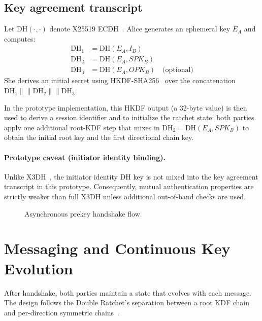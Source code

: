 \documentclass[11pt]{article}
\begin{document}
\subsection{Key agreement transcript}
Let $\mathrm{DH}(\cdot,\cdot)$ denote X25519 ECDH~\cite{rfc7748}.
Alice generates an ephemeral key $E_A$ and computes:
\begin{align*}
\mathrm{DH}_1 &= \mathrm{DH}(E_A, I_B) \\
\mathrm{DH}_2 &= \mathrm{DH}(E_A, SPK_B) \\
\mathrm{DH}_3 &= \mathrm{DH}(E_A, OPK_B) \quad \text{(optional)}
\end{align*}
She derives an initial secret using HKDF-SHA256~\cite{rfc5869} over the concatenation $\mathrm{DH}_1 \|\| \mathrm{DH}_2 \|\| \mathrm{DH}_3$.

In the prototype implementation, this HKDF output (a 32-byte value) is then used to derive a session identifier and to initialize the ratchet state: both parties apply one additional root-KDF step that mixes in $\mathrm{DH}_2 = \mathrm{DH}(E_A, SPK_B)$ to obtain the initial root key and the first directional chain key.

\paragraph{Prototype caveat (initiator identity binding).}
Unlike X3DH~\cite{signal_x3dh}, the initiator identity DH key is not mixed into the key agreement transcript in this prototype.
Consequently, mutual authentication properties are strictly weaker than full X3DH unless additional out-of-band checks are used.

\begin{figure}[t]
\centering
{}
\caption{Asynchronous prekey handshake flow.}
\label{fig:handshake}
\end{figure}

\section{Messaging and Continuous Key Evolution}
After handshake, both parties maintain a state that evolves with each message.
The design follows the Double Ratchet's separation between a root KDF chain and per-direction symmetric chains~\cite{signal_doubleratchet}.
\end{document}
